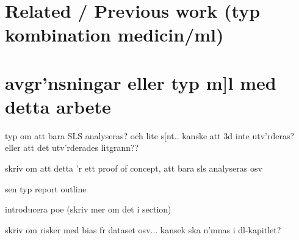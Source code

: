 

\section{Related / Previous work (typ kombination medicin/ml)}

\section{avgr'nsningar eller typ m]l med detta arbete}
typ om att bara SLS analyseras? och lite s[nt.. kanske att 3d inte utv'rderas? eller att det utv'rderades litgrann??

skriv om att detta 'r ett proof of concept, att bara sls analyseras osv

sen typ report outline


introducera poe  (skriv mer om det i section)

skriv om risker med bias fr dataset osv... kansek ska n'mnas i dl-kapitlet?


